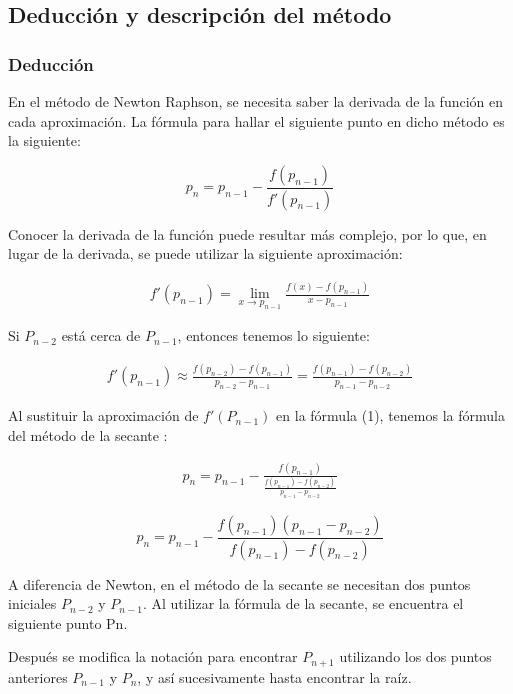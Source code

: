 \subsection{Deducción y descripción del método}
\subsubsection{Deducción}
En el método de Newton Raphson, se necesita saber la derivada de la función en cada aproximación. La fórmula para hallar el siguiente punto en dicho método es la siguiente:

\begin{equation}
p_n = p_{n-1} - \frac{f(p_{n-1})}{f'(p_{n-1})}
\end{equation} 

Conocer la derivada de la función puede resultar más complejo, por lo que, en lugar de la derivada, se puede utilizar la siguiente aproximación:

\begin{gather*}
f'(p_{n-1}) = \lim_{x\to p_{n-1}} \frac{f(x) - f(p_{n-1})}{x-p_{n-1}} 
\end{gather*}

Si $P_{n-2}$ está cerca de $P_{n-1}$, entonces tenemos lo siguiente:

\begin{gather*}
f'(p_{n-1}) \approx \frac{f(p_{n-2})-f(p_{n-1})}{p_{n-2}-p_{n-1}} = \frac{f(p_{n-1})-f(p_{n-2})}{p_{n-1}-p_{n-2}}
\end{gather*}

Al sustituir la aproximación de $f'(P_{n-1})$ en la fórmula (1), tenemos la fórmula del método de la secante \cite{Burden_English}:

\begin{gather*}
p_n = p_{n-1} - \frac{f(p_{n-1})}{\frac{f(p_{n-1})-f(p_{n-2})}{p_{n-1}-p_{n-2}}}
\end{gather*}

\begin{equation}
p_n = p_{n-1} - \frac{f(p_{n-1})(p_{n-1}-p_{n-2})}{f(p_{n-1})-f(p_{n-2})} 
\end{equation}


A diferencia de Newton, en el método de la secante se necesitan dos puntos iniciales $P_{n-2}$ y $P_{n-1}$. Al utilizar la fórmula de la secante, se encuentra el siguiente punto Pn. 

Después se modifica la notación para encontrar $P_{n+1}$ utilizando los dos puntos anteriores $P_{n-1}$ y $P_n$, y así sucesivamente hasta encontrar la raíz.

